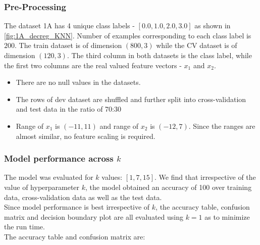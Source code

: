 \documentclass[11pt,a4paper]{article}
\newcommand{\noi}{\noindent}
\begin{document}
\subsubsection{Pre-Processing}
\label{sec:1_1_1}
The dataset 1A has 4 unique class labels - $[0.0, 1.0, 2.0, 3.0]$ as shown in \autoref{fig:1A_decreg_KNN}. Number of examples corresponding to each class label is $200$.
The train dataset is of dimension $(800,3)$ while the CV dataset is of dimension $(120,3)$. The third column in both datasets is the class label, while the first two columns are the real valued feature vectors - $x_1$ and $x_2$.
\begin{itemize}
    \itemsep0em
    \item There are no null values in the datasets. 
    \item The rows of dev dataset are shuffled and further split into cross-validation and test data in the ratio of 70:30
    \item Range of $x_1$ is $(-11,11)$ and range of $x_2$ is $(-12,7)$. Since the ranges are almost similar, no feature scaling is required.  
\end{itemize}

\subsubsection{Model performance across $k$}
The model was evaluated for $k$ values: $[1,7,15]$. We find that irrespective of the value of hyperparameter $k$, the model obtained an accuracy of 100 over training data, cross-validation data as well as the test data. \\

\noi
Since model performance is best irrespective of $k$, the accuracy table, confusion matrix and decision boundary plot are all evaluated using $k=1$ as to minimize the run time.\\

\noi
The accuracy table and confusion matrix are: 

\end{document}
